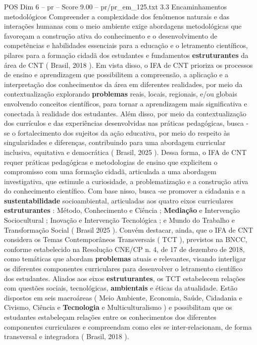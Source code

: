 \begin{textsample}{POS Dim 6 – pr – Score 9.00 – pr/pr\_em\_125.txt}  \label{ex:f6_pos_028}
3.3 Encaminhamentos metodológicos Compreender a complexidade dos fenômenos naturais e das interações humanas com o meio ambiente exige abordagens metodológicas que favoreçam a construção ativa do conhecimento e o desenvolvimento de competências e habilidades essenciais para a educação e o letramento científicos, pilares para a formação cidadã dos estudantes e fundamentos \textbf{estruturantes} da área de CNT ( Brasil, 2018 ).
Em vista disso, o IFA de CNT prioriza os processos de ensino e aprendizagem que possibilitem a compreensão, a aplicação e a interpretação dos conhecimentos da área em diferentes realidades, por meio da contextualização explorando \textbf{problemas} reais, locais, regionais, e/ou globais envolvendo conceitos científicos, para tornar a aprendizagem mais significativa e conectada à realidade dos estudantes.
Além disso, por meio da contextualização dos currículos e das experiências desenvolvidas nas práticas pedagógicas, busca -se o fortalecimento dos sujeitos da ação educativa, por meio do respeito às singularidades e diferenças, contribuindo para uma abordagem curricular inclusiva, equitativa e democrática ( Brasil, 2025 ).
Dessa forma, o IFA de CNT requer práticas pedagógicas e metodologias de ensino que explicitem o compromisso com uma formação cidadã, articulada a uma abordagem investigativa, que estimule a curiosidade, a problematização e a construção ativa do conhecimento científico.
Com base nisso, busca -se promover a cidadania e a \textbf{sustentabilidade} socioambiental, articuladas aos quatro eixos curriculares \textbf{estruturantes} : Método, Conhecimento e Ciência ; \textbf{Mediação} e Intervenção Sociocultural ; Inovação e Intervenção Tecnológica ; e Mundo do Trabalho e Transformação Social ( Brasil 2025 ).
Convém destacar, ainda, que o IFA de CNT considera os Temas Contemporâneos Transversais ( TCT ), previstos na BNCC, conforme estabelecido na Resolução CNE/CP n. 4, de 17 de dezembro de 2018, como temáticas que abordam \textbf{problemas} atuais e relevantes, visando interligar os diferentes componentes curriculares para desenvolver o letramento científico dos estudantes.
Aliados aos eixos \textbf{estruturantes}, os TCT estabelecem relações com questões sociais, tecnológicas, \textbf{ambientais} e éticas da atualidade.
Estão dispostos em seis macroáreas ( Meio Ambiente, Economia, Saúde, Cidadania e Civismo, Ciência e \textbf{Tecnologia} e Multiculturalismo ) e possibilitam que os estudantes estabeleçam relações entre os conhecimentos dos diferentes componentes curriculares e compreendam como eles se inter-relacionam, de forma transversal e integradora ( Brasil, 2018 ).

\end{textsample}
